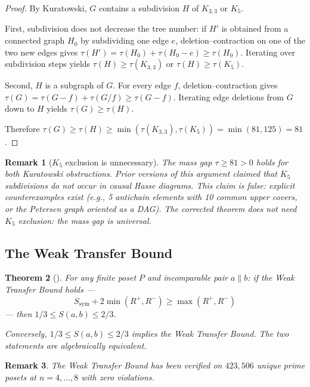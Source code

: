\documentclass[11pt]{article}
\newtheorem{theorem}{Theorem}[section]
\newtheorem{remark}[theorem]{Remark}
\newcommand{\Kthree}{K_{3,3}}
\begin{document}
\begin{proof}
By Kuratowski, $G$ contains a subdivision $H$ of $\Kthree$
or $K_5$.

First, subdivision does not decrease the tree number:
if $H'$ is obtained from a connected graph $H_0$ by
subdividing one edge $e$, deletion--contraction on one of
the two new edges gives
$\tau(H') = \tau(H_0) + \tau(H_0 - e) \ge \tau(H_0)$.
Iterating over subdivision steps yields
$\tau(H) \ge \tau(\Kthree)$ or $\tau(H) \ge \tau(K_5)$.

Second, $H$ is a subgraph of $G$.  For every edge $f$,
deletion--contraction gives
$\tau(G) = \tau(G-f) + \tau(G/f) \ge \tau(G-f)$.
Iterating edge deletions from $G$ down to $H$ yields
$\tau(G) \ge \tau(H)$.

Therefore
$\tau(G) \ge \tau(H) \ge \min(\tau(\Kthree), \tau(K_5))
= \min(81, 125) = 81$.
\end{proof}

\begin{remark}[$K_5$ exclusion is unnecessary]
\label{rem:k5}
The mass gap $\tau \ge 81 > 0$ holds for \emph{both}
Kuratowski obstructions.  Prior versions of this argument
claimed that $K_5$ subdivisions do not occur in causal
Hasse diagrams.  This claim is false: explicit
counterexamples exist (e.g., 5 antichain elements with
10 common upper covers, or the Petersen graph oriented as
a DAG).  The corrected theorem does not need $K_5$
exclusion: the mass gap is universal.
\end{remark}

\subsection{The Weak Transfer Bound}

\begin{theorem}[{\cite{SilvaAlvarado26}}]
\label{thm:wtb}
For any finite poset $P$ and incomparable pair $a \parallel b$:
if the Weak Transfer Bound holds ---
\[
  S_{\mathrm{sym}} + 2\min(R^+, R^-) \ge \max(R^+, R^-)
\]
--- then $1/3 \le S(a,b) \le 2/3$.

Conversely, $1/3 \le S(a,b) \le 2/3$ implies the Weak
Transfer Bound.  The two statements are algebraically
equivalent.
\end{theorem}

\begin{remark}
The Weak Transfer Bound has been verified on $423{,}506$
unique prime posets at $n = 4, \ldots, 8$ with zero
violations.
\end{remark}
\end{document}
